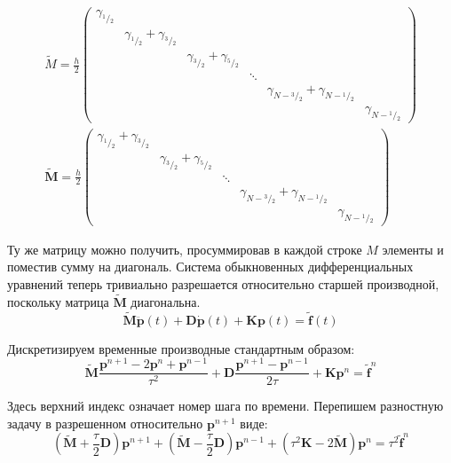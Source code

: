\documentclass[12pt]{article}
\newcommand{\cutefrac}[2]{{}^{#1\!}\!/{\!}_#2}
\newcommand{\half}{\cutefrac{1}{2}}
\begin{document}
\begin{gather*}
\widetilde{M} = \frac{h}{2}
\begin{pmatrix}
\gamma_{\half} & \\
& \gamma_{\half} + \gamma_{\cutefrac{3}{2}}\\
& & \gamma_{\cutefrac{3}{2}} + \gamma_{\cutefrac{5}{2}}\\
& & & \ddots \\
& & & & \gamma_{N - \cutefrac{3}{2}} + \gamma_{N - \half}\\
& & & & & \gamma_{N-\half}
\end{pmatrix}
\\
\widetilde{\mathbf{M}} = \frac{h}{2}
\begin{pmatrix}
\gamma_{\half} + \gamma_{\cutefrac{3}{2}}\\
& \gamma_{\cutefrac{3}{2}} + \gamma_{\cutefrac{5}{2}}\\
& & \ddots \\
& & & \gamma_{N - \cutefrac{3}{2}} + \gamma_{N - \half}\\
& & & & \gamma_{N-\half}
\end{pmatrix}
\end{gather*}

Ту же матрицу можно получить, просуммировав в каждой строке $M$ элементы и поместив
сумму на диагональ. Система обыкновенных дифференциальных уравнений теперь
тривиально разрешается относительно старшей производной, поскольку матрица
$\widetilde{\mathbf{M}}$ диагональна.
\begin{equation}
\widetilde{\mathbf{M}} \ddot{\mathbf{p}}(t) + \mathbf{D} \dot{\mathbf{p}}(t)
+ \mathbf{K} \mathbf{p}(t) = \widetilde{\mathbf{f}}(t)
\label{eq:vector2}
\end{equation}

Дискретизируем временные производные стандартным образом:
\begin{equation}
\widetilde{\mathbf{M}}
\frac{\mathbf{p}^{n+1} -2 \mathbf{p}^n + \mathbf{p}^{n-1}}{\tau^2}
+
\mathbf{D}
\frac{\mathbf{p}^{n+1} - \mathbf{p}^{n-1}}{2\tau}
+
\mathbf{K} \mathbf{p}^n = \widetilde{\mathbf{f}}^n
\label{eq:difference}
\end{equation}

Здесь верхний индекс означает номер шага по времени. Перепишем разностную задачу
в разрешенном относительно $\mathbf{p}^{n+1}$ виде:
\begin{equation}
\left(
\widetilde{\mathbf{M}} + \frac{\tau}{2} \mathbf{D}
\right)
\mathbf{p}^{n+1}
+
\left(
\widetilde{\mathbf{M}} - \frac{\tau}{2} \mathbf{D}
\right)
\mathbf{p}^{n-1}
+
\left(
\tau^2\mathbf{K}-2\widetilde{\mathbf{M}}
\right)
\mathbf{p}^n
 = \tau^2\widetilde{\mathbf{f}}^n
\label{eq:difference2}
\end{equation}
\end{document}
